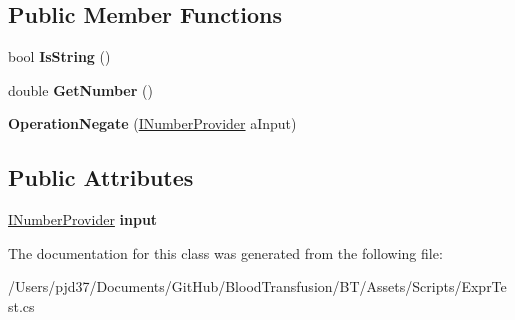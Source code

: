 \subsection*{Public Member Functions}
\begin{DoxyCompactItemize}
\item 
bool {\bfseries Is\+String} ()\hypertarget{class_b83_1_1_logic_expression_parser_1_1_operation_negate_ac4bcd868ae9f5eef4c9214e6e06a8ad3}{}\label{class_b83_1_1_logic_expression_parser_1_1_operation_negate_ac4bcd868ae9f5eef4c9214e6e06a8ad3}

\item 
double {\bfseries Get\+Number} ()\hypertarget{class_b83_1_1_logic_expression_parser_1_1_operation_negate_a084811e39b97cca51ee93103f6fb1698}{}\label{class_b83_1_1_logic_expression_parser_1_1_operation_negate_a084811e39b97cca51ee93103f6fb1698}

\item 
{\bfseries Operation\+Negate} (\hyperlink{interface_b83_1_1_logic_expression_parser_1_1_i_number_provider}{I\+Number\+Provider} a\+Input)\hypertarget{class_b83_1_1_logic_expression_parser_1_1_operation_negate_ad0c32658d618789396b7a4f122243241}{}\label{class_b83_1_1_logic_expression_parser_1_1_operation_negate_ad0c32658d618789396b7a4f122243241}

\end{DoxyCompactItemize}
\subsection*{Public Attributes}
\begin{DoxyCompactItemize}
\item 
\hyperlink{interface_b83_1_1_logic_expression_parser_1_1_i_number_provider}{I\+Number\+Provider} {\bfseries input}\hypertarget{class_b83_1_1_logic_expression_parser_1_1_operation_negate_a063fc3c50d8cb42629ea01eef1f0d15d}{}\label{class_b83_1_1_logic_expression_parser_1_1_operation_negate_a063fc3c50d8cb42629ea01eef1f0d15d}

\end{DoxyCompactItemize}


The documentation for this class was generated from the following file\+:\begin{DoxyCompactItemize}
\item 
/\+Users/pjd37/\+Documents/\+Git\+Hub/\+Blood\+Transfusion/\+B\+T/\+Assets/\+Scripts/Expr\+Test.\+cs\end{DoxyCompactItemize}
